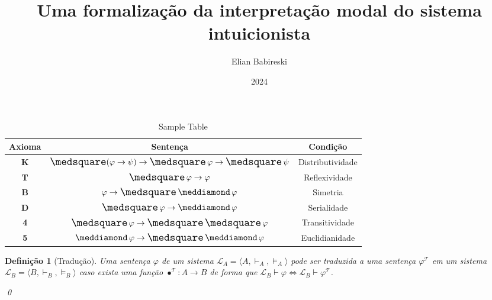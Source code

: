\documentclass{report}
\newtheorem{definition}{Definição}
\begin{document}
    \title{Uma formalização da interpretação modal do sistema intuicionista}
    \author{Elian Babireski}
    \date{2024}

    \maketitle


    \begin{table}[h]
        \centering
        \begin{tabular}{|c|c|c|}
            \hline
            \textbf{Axioma} & \textbf{Sentença}                                       & \textbf{Condição} \\ \hline
            \textbf{K}      & $\nec(\varphi \to \psi) \to \nec \varphi \to \nec \psi$ & Distributividade  \\ \hline
            \textbf{T}      & $\nec \varphi \to \varphi$                              & Reflexividade     \\ \hline
            \textbf{B}      & $\varphi \to \nec \pos \varphi$                         & Simetria          \\ \hline
            \textbf{D}      & $\nec \varphi \to \pos \varphi$                         & Serialidade       \\ \hline
            \textbf{4}      & $\nec \varphi \to \nec \nec \varphi$                    & Transitividade    \\ \hline
            \textbf{5}      & $\pos \varphi \to \nec \pos \varphi$                    & Euclidianidade    \\ \hline
        \end{tabular}
        \caption{Sample Table}
        \label{tab:sample_table}
    \end{table}

    \begin{definition}[Tradução] 
        Uma sentença $\varphi$ de um sistema $\mathcal{L}_A = \langle A, \vdash_A, \vDash_A \rangle$ pode ser traduzida a uma sentença $\varphi^\mathcal{T}$ em um sistema $\mathcal{L}_B = \langle B, \vdash_B, \vDash_B \rangle$ caso exista uma função $\bullet^\mathcal{T} : A \to B$ de forma que $\mathcal{L}_B \vdash \varphi \Leftrightarrow \mathcal{L}_B \vdash \varphi^\mathcal{T}$.
        
        \qed
    \end{definition}
\end{document}
